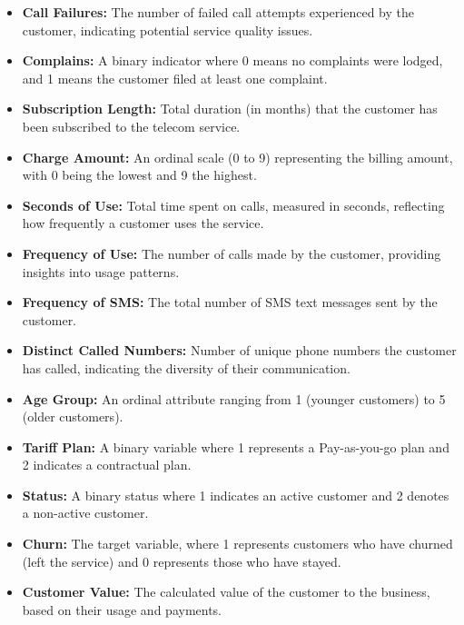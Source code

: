\documentclass[12pt]{article}
\begin{document}
\begin{itemize}
    \item \textbf{Call Failures:} The number of failed call attempts experienced by the customer, indicating potential service quality issues.
    \item \textbf{Complains:} A binary indicator where 0 means no complaints were lodged, and 1 means the customer filed at least one complaint.
    \item \textbf{Subscription Length:} Total duration (in months) that the customer has been subscribed to the telecom service.
    \item \textbf{Charge Amount:} An ordinal scale (0 to 9) representing the billing amount, with 0 being the lowest and 9 the highest.
    \item \textbf{Seconds of Use:} Total time spent on calls, measured in seconds, reflecting how frequently a customer uses the service.
    \item \textbf{Frequency of Use:} The number of calls made by the customer, providing insights into usage patterns.
    \item \textbf{Frequency of SMS:} The total number of SMS text messages sent by the customer.
    \item \textbf{Distinct Called Numbers:} Number of unique phone numbers the customer has called, indicating the diversity of their communication.
    \item \textbf{Age Group:} An ordinal attribute ranging from 1 (younger customers) to 5 (older customers).
    \item \textbf{Tariff Plan:} A binary variable where 1 represents a Pay-as-you-go plan and 2 indicates a contractual plan.
    \item \textbf{Status:} A binary status where 1 indicates an active customer and 2 denotes a non-active customer.
    \item \textbf{Churn:} The target variable, where 1 represents customers who have churned (left the service) and 0 represents those who have stayed.
    \item \textbf{Customer Value:} The calculated value of the customer to the business, based on their usage and payments.
\end{itemize}
\end{document}
